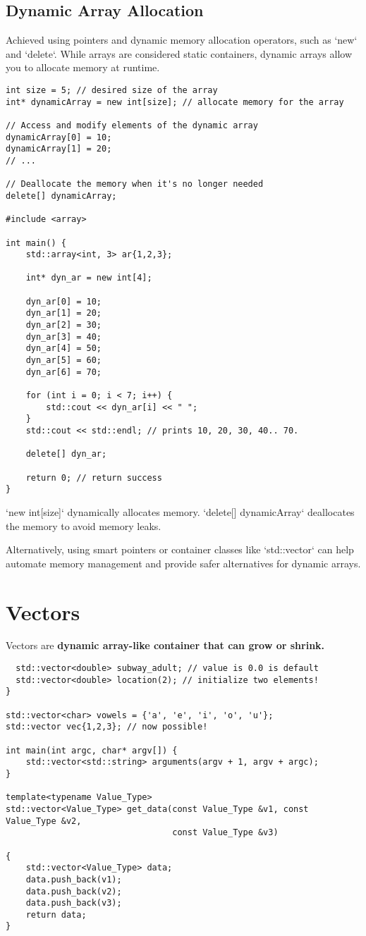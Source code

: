 \subsection{Dynamic Array Allocation}

Achieved using pointers and dynamic memory allocation operators, such as `new` and `delete`. 
While arrays are considered static containers,
dynamic arrays allow you to allocate memory at runtime.

\begin{verbatim}
int size = 5; // desired size of the array
int* dynamicArray = new int[size]; // allocate memory for the array

// Access and modify elements of the dynamic array
dynamicArray[0] = 10;
dynamicArray[1] = 20;
// ...

// Deallocate the memory when it's no longer needed
delete[] dynamicArray;

#include <array>

int main() {
    std::array<int, 3> ar{1,2,3};

    int* dyn_ar = new int[4];

    dyn_ar[0] = 10;
    dyn_ar[1] = 20;
    dyn_ar[2] = 30;
    dyn_ar[3] = 40;
    dyn_ar[4] = 50;
    dyn_ar[5] = 60;
    dyn_ar[6] = 70;

    for (int i = 0; i < 7; i++) {
        std::cout << dyn_ar[i] << " ";
    }
    std::cout << std::endl; // prints 10, 20, 30, 40.. 70.

    delete[] dyn_ar;

    return 0; // return success
}

\end{verbatim}

`new int[size]` dynamically allocates memory. 
`delete[] dynamicArray` deallocates the memory to avoid memory leaks.

Alternatively, using smart pointers or container classes like `std::vector` can help automate memory management
and provide safer alternatives for dynamic arrays.

\section{Vectors}

Vectors are \textbf{dynamic array-like container that can grow or shrink.}

\begin{verbatim}
  std::vector<double> subway_adult; // value is 0.0 is default
  std::vector<double> location(2); // initialize two elements! 
}

std::vector<char> vowels = {'a', 'e', 'i', 'o', 'u'};
std::vector vec{1,2,3}; // now possible! 

int main(int argc, char* argv[]) {
    std::vector<std::string> arguments(argv + 1, argv + argc);
}

template<typename Value_Type>
std::vector<Value_Type> get_data(const Value_Type &v1, const Value_Type &v2,
                                 const Value_Type &v3)

{
    std::vector<Value_Type> data;
    data.push_back(v1);
    data.push_back(v2);
    data.push_back(v3);
    return data;
}
\end{verbatim}

